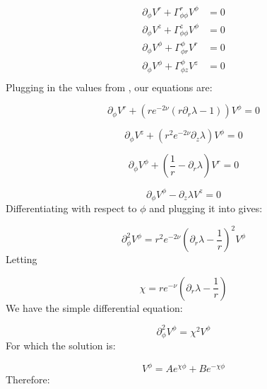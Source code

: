 \documentclass{article}
\begin{document}
\begin{equation}
\begin{aligned}
\partial_{\phi}V^{r}+\Gamma^{r}_{\phi\phi}V^{\phi}&=0\\
\partial_{\phi}V^{z}+\Gamma^{z}_{\phi\phi}V^{\phi}&=0\\
\partial_{\phi}V^{\phi}+\Gamma^{\phi}_{\phi r}V^{r}&=0\\
\partial_{\phi}V^{\phi}+\Gamma^{\phi}_{\phi z}V^{z}&=0\\
\end{aligned}
\end{equation}
Plugging in the values from , our equations are: 

\begin{equation}
\partial_{\phi}V^{r}+\left(re^{-2\nu}\left(r\partial_{r}\lambda-1\right)\right)V^{\phi}=0\label{eq:V-r-phi}
\end{equation}

\begin{equation}
\partial_{\phi}V^{z}+\left(r^{2}e^{-2\nu}\partial_{z}\lambda\right)V^{\phi}=0
\end{equation}

\begin{equation}
\partial_{\phi}V^{\phi}+\left(\frac{1}{r}-\partial_{r}\lambda\right)V^{r}=0\label{eq:V-phi-r}
\end{equation}

\begin{equation}
\partial_{\phi}V^{\phi}-\partial_{z}\lambda V^{z}=0\label{eq:V-phi-z}
\end{equation}
Differentiating  with respect to $\phi$ and plugging it into  gives:

\begin{equation}
\partial^{2}_{\phi}V^{\phi}=r^{2}e^{-2\nu}\left(\partial_r\lambda-\frac{1}{r}\right)^2V^{\phi}
\end{equation}
Letting 

\begin{equation}
\chi=re^{-\nu}(\partial_r\lambda-\frac{1}{r})
\label{eq:def-chi}
\end{equation}
We have the simple differential equation:

\begin{equation}
\partial^2_\phi V^\phi=\chi^2 V^\phi
\end{equation}
For which the solution is:

\begin{equation}
V^{\phi}=Ae^{\chi\phi}+Be^{-\chi\phi}
\end{equation}
Therefore:
\end{document}
